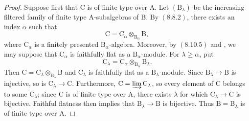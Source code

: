 \begin{proof}
Suppose first that $\mathrm{C}$ is of finite type over $\mathrm{A}$. Let $(\mathrm{B}_\lambda)$ be the increasing filtered family of finite type $\mathrm{A}$-subalgebras of $\mathrm{B}$. By $(8.8.2)$, there exists an index $\alpha$ such that
\[
  \mathrm{C}=\mathrm{C}_\alpha\otimes_{\mathrm{B}_\alpha}\mathrm{B},
\]
where $\mathrm{C}_\alpha$ is a finitely presented $\mathrm{B}_\alpha$-algebra. Moreover, by $(8.10.5)$ and , we may suppose that $\mathrm{C}_\alpha$ is faithfully flat as a $\mathrm{B}_\alpha$-module. For $\lambda\geqslant\alpha$, put
\[
  \mathrm{C}_\lambda
  =\mathrm{C}_\alpha\otimes_{\mathrm{B}_\alpha}\mathrm{B}_\lambda.
\]
Then $\mathrm{C}=\mathrm{C}_\lambda\otimes_{\mathrm{B}_\lambda}\mathrm{B}$ and $\mathrm{C}_\lambda$ is faithfully flat as a $\mathrm{B}_\lambda$-module. Since $\mathrm{B}_\lambda\to\mathrm{B}$ is injective, so is $\mathrm{C}_\lambda\to\mathrm{C}$. Furthermore, $\mathrm{C}=\varinjlim\mathrm{C}_\lambda$, so every element of $\mathrm{C}$ belongs to some $\mathrm{C}_\lambda$; since $\mathrm{C}$ is of finite type over $\mathrm{A}$, there exists $\lambda$ for which $\mathrm{C}_\lambda\to\mathrm{C}$  is bijective. Faithful flatness then implies that $\mathrm{B}_\lambda\to\mathrm{B}$ is bijective. Thus $\mathrm{B}=\mathrm{B}_\lambda$ is of finite type over $\mathrm{A}$.


\end{proof}
